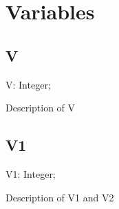 \documentclass{report}
\begin{document}
\section{Variables}
\subsection*{V}
\begin{list}{}{
\setlength{\itemindent}{0cm}
\setlength{\listparindent}{0cm}
\setlength{\leftmargin}{\evensidemargin}
\addtolength{\leftmargin}{\tmplength}
\settowidth{\labelsep}{X}
\addtolength{\leftmargin}{\labelsep}
\setlength{\labelwidth}{\tmplength}
}
\begin{flushleft}
\item[\textbf{Declaration}\hfill]
\begin{ttfamily}
V: Integer;\end{ttfamily}


\end{flushleft}
\par
\item[\textbf{Description}]
Description of V

\end{list}
\subsection*{V1}
\begin{list}{}{
\setlength{\itemindent}{0cm}
\setlength{\listparindent}{0cm}
\setlength{\leftmargin}{\evensidemargin}
\addtolength{\leftmargin}{\tmplength}
\settowidth{\labelsep}{X}
\addtolength{\leftmargin}{\labelsep}
\setlength{\labelwidth}{\tmplength}
}
\begin{flushleft}
\item[\textbf{Declaration}\hfill]
\begin{ttfamily}
V1: Integer;\end{ttfamily}


\end{flushleft}
\par
\item[\textbf{Description}]
Description of V1 and V2

\end{list}
\end{document}
